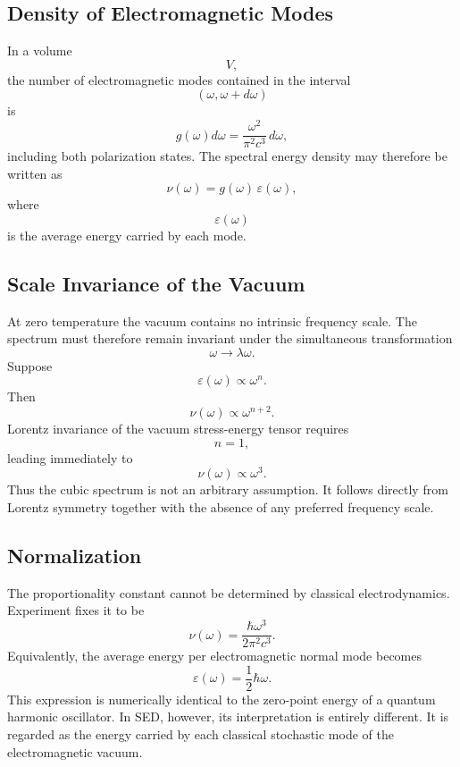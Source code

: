 \subsection{Density of Electromagnetic Modes}
In a volume
\[V,\]
the number of electromagnetic modes contained in the interval
\[(\omega,\omega+d\omega)\]
is
\begin{equation}
g(\omega)d\omega=\frac{\omega^2}{\pi^2c^3}\,d\omega,
\label{eq:ModeDensity}
\end{equation}
including both polarization states.
The spectral energy density may therefore be written as
\begin{equation}
\nu(\omega)=g(\omega)\,\varepsilon(\omega),
\end{equation}
where
\[\varepsilon(\omega)\]
is the average energy carried by each mode.
\subsection{Scale Invariance of the Vacuum}
At zero temperature the vacuum contains no intrinsic frequency scale.
The spectrum must therefore remain invariant under the simultaneous
transformation
\[\omega\rightarrow\lambda\omega .\]
Suppose
\[\varepsilon(\omega)\propto\omega^n .\]
Then
\[\nu(\omega)\propto\omega^{n+2}.\]
Lorentz invariance of the vacuum stress-energy tensor requires
\[n=1,\]
leading immediately to
\begin{equation}
\boxed{\nu(\omega)\propto\omega^3.}
\end{equation}
Thus the cubic spectrum is not an arbitrary assumption.
It follows directly from Lorentz symmetry together with the absence of
any preferred frequency scale.
\subsection{Normalization}
The proportionality constant cannot be determined by classical
electrodynamics.
Experiment fixes it to be
\begin{equation}
\boxed{\nu(\omega)=\frac{\hbar\omega^3}{2\pi^2c^3}.}
\label{eq:FinalSpectrum}
\end{equation}
Equivalently,
the average energy per electromagnetic normal mode becomes
\begin{equation}
\boxed{\varepsilon(\omega)=\frac12\hbar\omega.}
\label{eq:HalfQuantum}
\end{equation}
This expression is numerically identical to the zero-point energy of a
quantum harmonic oscillator.
In SED, however, its interpretation is entirely different.
It is regarded as the energy carried by each classical stochastic mode
of the electromagnetic vacuum.
